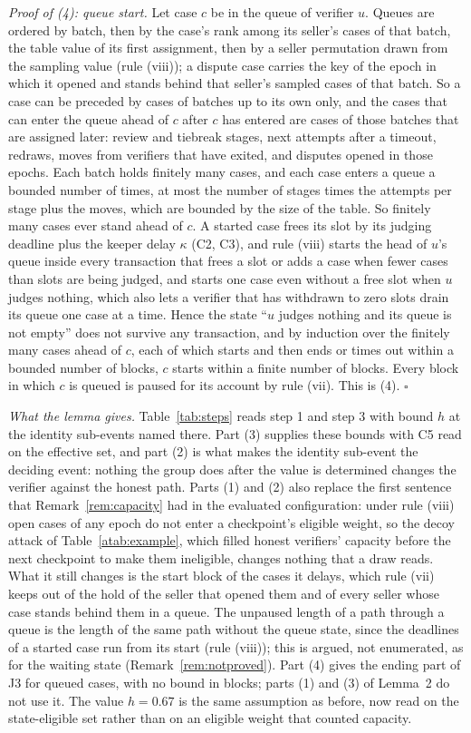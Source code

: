 \documentclass[10pt,a4paper]{article}
\theoremstyle{plain}
\theoremstyle{remark}
\begin{document}
\emph{Proof of (4): queue start.} Let case $c$ be in the queue of verifier $u$. Queues are ordered by batch, then by the case's rank among its seller's cases of that batch, the table value of its first assignment, then by a seller permutation drawn from the sampling value (rule (viii)); a dispute case carries the key of the epoch in which it opened and stands behind that seller's sampled cases of that batch. So a case can be preceded by cases of batches up to its own only, and the cases that can enter the queue ahead of $c$ after $c$ has entered are cases of those batches that are assigned later: review and tiebreak stages, next attempts after a timeout, redraws, moves from verifiers that have exited, and disputes opened in those epochs. Each batch holds finitely many cases, and each case enters a queue a bounded number of times, at most the number of stages times the attempts per stage plus the moves, which are bounded by the size of the table. So finitely many cases ever stand ahead of $c$. A started case frees its slot by its judging deadline plus the keeper delay $\kappa$ (C2, C3), and rule (viii) starts the head of $u$'s queue inside every transaction that frees a slot or adds a case when fewer cases than slots are being judged, and starts one case even without a free slot when $u$ judges nothing, which also lets a verifier that has withdrawn to zero slots drain its queue one case at a time. Hence the state ``$u$ judges nothing and its queue is not empty'' does not survive any transaction, and by induction over the finitely many cases ahead of $c$, each of which starts and then ends or times out within a bounded number of blocks, $c$ starts within a finite number of blocks. Every block in which $c$ is queued is paused for its account by rule (vii). This is (4). \hfill$\square$

\emph{What the lemma gives.} Table~\ref{tab:steps} reads step 1 and step 3 with bound $h$ at the identity sub-events named there. Part (3) supplies these bounds with C5 read on the effective set, and part (2) is what makes the identity sub-event the deciding event: nothing the group does after the value is determined changes the verifier against the honest path. Parts (1) and (2) also replace the first sentence that Remark~\ref{rem:capacity} had in the evaluated configuration: under rule (viii) open cases of any epoch do not enter a checkpoint's eligible weight, so the decoy attack of Table~\ref{atab:example}, which filled honest verifiers' capacity before the next checkpoint to make them ineligible, changes nothing that a draw reads. What it still changes is the start block of the cases it delays, which rule (vii) keeps out of the hold of the seller that opened them and of every seller whose case stands behind them in a queue. The unpaused length of a path through a queue is the length of the same path without the queue state, since the deadlines of a started case run from its start (rule (viii)); this is argued, not enumerated, as for the waiting state (Remark~\ref{rem:notproved}). Part (4) gives the ending part of J3 for queued cases, with no bound in blocks; parts (1) and (3) of Lemma~2 do not use it. The value $h=0.67$ is the same assumption as before, now read on the state-eligible set rather than on an eligible weight that counted capacity.
\end{document}
